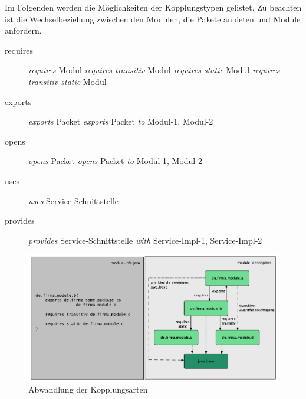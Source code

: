     Im Folgenden werden die Möglichkeiten der Kopplungstypen gelistet. Zu beachten ist die Wechselbeziehung zwischen den Modulen, die Pakete anbieten und Module anfordern. 

    \begin{description}
      \item[requires]\hfill
      \newline \textit{requires} Modul
      \newline \textit{requires transitiv} Modul
      \newline \textit{requires static} Modul
      \newline \textit{requires transitiv static} Modul
      \item[exports]\hfill
      \newline \textit{exports} Packet
      \newline \textit{exports} Packet \textit{to} Modul-1, Modul-2
      \item[opens]\hfill
      \newline \textit{opens} Packet
      \newline \textit{opens} Packet \textit{to} Modul-1, Modul-2
      \item [uses]\hfill
      \newline \textit{uses} Service-Schnittstelle 
      \item[provides]\hfill
        \newline \textit{provides} Service-Schnittstelle \textit{with} Service-Impl-1, Service-Impl-2
  \end{description}

  \begin{figure}[h!]
      \centering
      \includegraphics[width=\textwidth]{material/images/transitiv4.png}
      \caption{Abwandlung der Kopplungsarten}
      \label{fig:abw-kopl}
  \end{figure}

